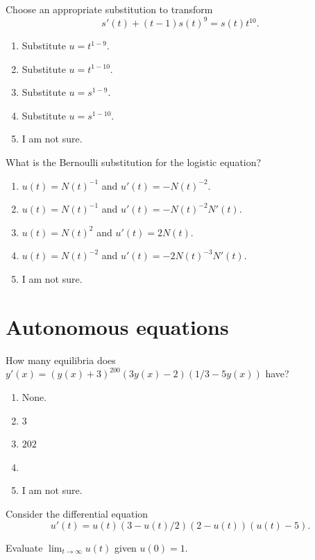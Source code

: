 \documentclass[aspectratio=169, t, 14pt]{beamer}
\begin{document}
\begin{frame}[t]
  Choose an appropriate substitution to transform
  \[
    s'(t) + (t-1)s(t)^{9} = s(t) t^{10}.
  \]

  \begin{enumerate} 
    \item Substitute \(u = t^{1-9}\).
    \item Substitute \(u = t^{1-10}\).
    \item Substitute \(u = s^{1-9}\).
    \item Substitute \(u = s^{1-10}\).
    \item I am not sure.
  \end{enumerate} 
\end{frame}

\begin{frame}[t]
  What is the Bernoulli substitution for the logistic equation?

  \begin{enumerate}
    \item \(u(t) = N(t)^{-1}\) and \(u'(t) = -N(t)^{-2}\).
    \item \(u(t) = N(t)^{-1}\) and \(u'(t) = -N(t)^{-2}N'(t)\).
    \item \(u(t) = N(t)^{2}\) and \(u'(t) = 2N(t)\).
    \item \(u(t) = N(t)^{-2}\) and \(u'(t) = -2 N(t)^{-3}N'(t)\).
    \item I am not sure.
  \end{enumerate}
\end{frame}

\section{Autonomous equations}

\begin{poll}
  How many equilibria does \(y'(x) = (y(x) + 3)^{200} (3y(x) - 2) (1/3 - 5y(x))\) have?

  \begin{enumerate}
    \item None.
    \item \(3\)
    \item \(202\)
    \item
    \item I am not sure.
  \end{enumerate}
\end{poll}


\begin{poll}
  Consider the differential equation \[u'(t) = u(t)(3 - u(t)/2)(2 - u(t))(u(t) - 5).\]

  Evaluate \(\lim_{t \to \infty} u(t)\) given \(u(0) = 1\).
\end{poll}
\end{document}
